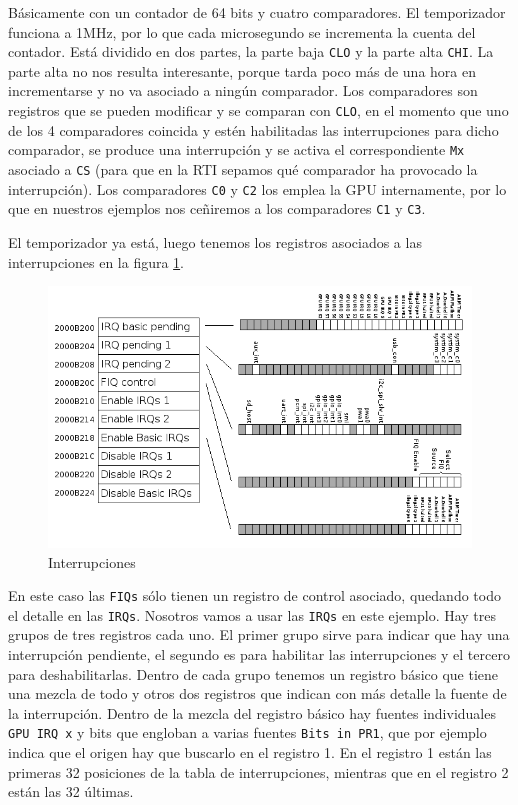 Básicamente con un contador de 64 bits y cuatro comparadores. El temporizador funciona a 1MHz,
por lo que cada microsegundo se incrementa la cuenta del contador. Está dividido en dos partes,
la parte baja {\tt CLO} y la parte alta {\tt CHI}. La parte alta no nos resulta interesante,
porque tarda poco más de una hora en incrementarse y no va asociado a ningún comparador. Los
comparadores son registros que se pueden modificar y se comparan con {\tt CLO}, en el momento
que uno de los 4 comparadores coincida y estén habilitadas las interrupciones para dicho
comparador, se produce una interrupción y se activa el correspondiente {\tt Mx}
asociado a {\tt CS} (para que en la RTI sepamos qué comparador ha provocado la interrupción).
Los comparadores {\tt C0} y {\tt C2} los emplea la GPU internamente, por lo que en nuestros
ejemplos nos ceñiremos a los comparadores {\tt C1} y {\tt C3}.

El temporizador ya está, luego tenemos los registros asociados a las interrupciones en la figura
\ref{fig:interrupciones}.

\begin{figure}[h]
  \centering
    \includegraphics[width=14cm]{graphs/interrupciones.png}
  \caption{Interrupciones}
  \label{fig:interrupciones}
\end{figure}

En este caso las {\tt FIQs} sólo tienen un registro de control asociado, quedando todo el detalle
en las {\tt IRQs}. Nosotros vamos a usar las {\tt IRQs} en este ejemplo. Hay tres grupos de tres
registros cada uno. El primer grupo sirve para indicar que hay una interrupción pendiente, el
segundo es para habilitar las interrupciones y el tercero para deshabilitarlas. Dentro de cada
grupo tenemos un registro básico que tiene una mezcla de todo y otros dos registros que
indican con más detalle la fuente de la interrupción. Dentro de la mezcla del registro básico
hay fuentes individuales {\tt GPU IRQ x} y bits que engloban a varias fuentes {\tt Bits in PR1},
que por ejemplo indica que el origen hay que buscarlo en el registro 1. En el registro 1 están
las primeras 32 posiciones de la tabla de interrupciones, mientras que en el registro 2 están
las 32 últimas.

